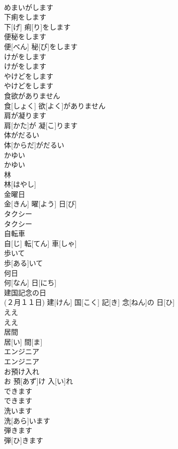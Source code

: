 \documentclass[8pt]{extreport}
\begin{document}
\begin{CJK}{UTF8}{min}
\\	めまいがします		
\\	下痢をします	
\\	下[げ] 痢[り]をします		
\\	便秘をします	
\\	便[べん] 秘[ぴ]をします		
\\	けがをします	
\\	けがをします		
\\	やけどをします	
\\	やけどをします		
\\	食欲がありません	
\\	食[しょく] 欲[よく]がありません		
\\	肩が凝ります	
\\	肩[かた]が 凝[こ]ります		
\\	体がだるい	
\\	体[からだ]がだるい		
\\	かゆい	
\\	かゆい		
\\	林	
\\	林[はやし]		
\\	金曜日	
\\	金[きん] 曜[よう] 日[び]		
\\	タクシー	
\\	タクシー		
\\	自転車	
\\	自[じ] 転[てん] 車[しゃ]		
\\	歩いて	
\\	歩[ある]いて		
\\	何日	
\\	何[なん] 日[にち]		
\\	建国記念の日	
\\	(２月１１日)	建[けん] 国[こく] 記[き] 念[ねん]の 日[ひ]		
\\	ええ	
\\	ええ		
\\	居間	
\\	居[い] 間[ま]		
\\	エンジニア	
\\	エンジニア		
\\	お預け入れ	
\\	お 預[あず]け 入[い]れ		
\\	できます	
\\	できます		
\\	洗います	
\\	洗[あら]います		
\\	弾きます	
\\	弾[ひ]きます		

\end{CJK}
\end{document}
